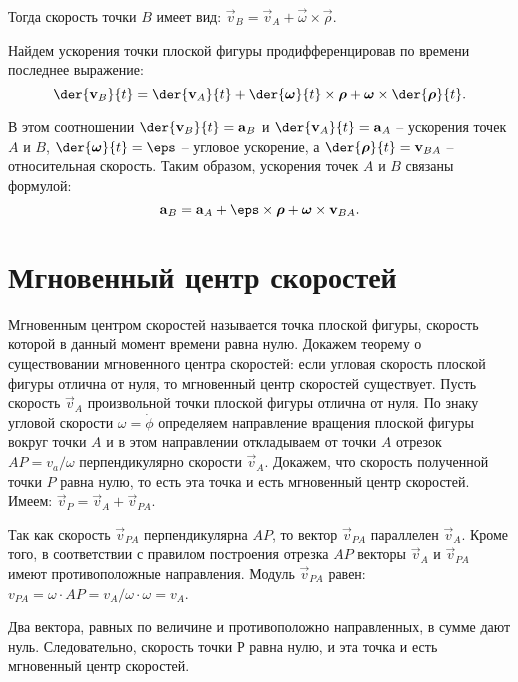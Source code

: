 Тогда скорость точки \( B \) имеет вид: \( \vec{v}_B = \vec{v}_A +
\vec{\omega}\times\vec{\rho} \).

Найдем ускорения точки плоской фигуры продифференцировав по времени последнее
выражение:
\[
    \der{\vec{v}_B}{t} = \der{\vec{v}_A}{t} + \der{\vec{\omega}}{t}\times
    \vec{\rho} + \vec{\omega}\times\der{\vec{\rho}}{t}.
\]
 
В этом соотношении \( \ds \der{\vec{v}_B}{t} = \vec{a}_B \) и
\( \ds \der{\vec{v}_A}{t} = \vec{a}_A \) -- ускорения точек \( A \) и \( B \),
\( \ds \der{\vec{\omega}}{t} = \vec{\eps} \) -- угловое ускорение, а
\( \ds \der{\vec{\rho}}{t} = \vec{v}_{BA} \) -- относительная скорость. Таким
образом, ускорения точек \( A \) и \( B \) связаны формулой:
\[
    \vec{a}_B = \vec{a}_A + \vec{\eps}\times\vec{\rho} +
    \vec{\omega}\times\vec{v}_{BA}.
\]

\section{Мгновенный центр скоростей}
Мгновенным центром скоростей называется точка плоской фигуры, скорость которой в
данный момент времени равна нулю. Докажем теорему о существовании мгновенного
центра скоростей: если угловая скорость плоской фигуры отлична от нуля, то
мгновенный центр скоростей существует. Пусть скорость \( \vec{v}_A \)
произвольной точки плоской фигуры отлична от нуля. По знаку угловой скорости
\( \omega = \dot{\phi} \) определяем направление вращения плоской фигуры вокруг
точки \( A \) и в этом направлении откладываем от точки \( A \) отрезок
\( AP = v_a/\omega \) перпендикулярно скорости \( \vec{v}_A \).
Докажем, что скорость полученной точки \( P \) равна нулю, то есть эта точка и
есть мгновенный центр скоростей. Имеем: \( \vec{v}_P = \vec{v}_A +
\vec{v}_{PA} \).
 
Так как скорость \( \vec{v}_{PA} \) перпендикулярна \( AP \), то вектор
\( \vec{v}_{PA} \) параллелен \( \vec{v}_A \). Кроме того, в соответствии с
правилом построения отрезка \( AP \) векторы \( \vec{v}_A \) и
\( \vec{v}_{PA} \) имеют противоположные направления. Модуль \( \vec{v}_{PA} \)
равен: \( v_{PA} = \omega\cdot AP = v_A/\omega\cdot\omega = v_A \).

Два вектора, равных по величине и противоположно направленных, в сумме дают нуль.
Следовательно, скорость точки Р равна нулю, и эта точка и есть мгновенный центр
скоростей.

\newpage %

